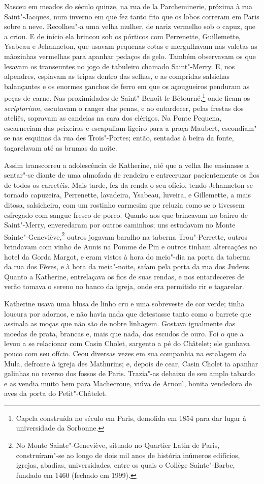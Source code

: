 Nasceu em meados do século quinze, na rua de la Parcheminerie, próxima à
rua Saint"-Jacques, num inverno em que fez tanto frio que os lobos correram
em Paris sobre a neve. Recolheu"-a uma velha mulher, de nariz vermelho sob
o capuz, que a criou. E de início ela brincou sob os pórticos com
Perrenette, Guillemette, Ysabeau e Jehanneton, que usavam pequenas cotas e
mergulhavam nas valetas as mãozinhas vermelhas para apanhar pedaços de
gelo. Também observavam os que lesavam os transeuntes no jogo de tabuleiro
chamado Saint"-Merry. E, nos alpendres, espiavam as tripas dentro das
selhas, e as compridas salsichas balançantes e os enormes ganchos de ferro
em que os açougueiros penduram as peças de carne. Nas proximidades de
Saint"-Benoît le Bétourné,\footnote{ Capela construída no século  em
Paris, demolida em 1854 para dar lugar à universidade da Sorbonne.} 
onde ficam os \textit{scriptorium}, escutavam o ranger das penas, e
ao entardecer, pelas frestas dos ateliês, sopravam as candeias na cara dos
clérigos. Na Ponte Pequena, escarneciam das peixeiras e escapuliam ligeiro
para a praça Maubert, escondiam"-se nas esquinas da rua des Trois"-Portes;
então, sentadas à beira da fonte, tagarelavam até as brumas da noite.

Assim transcorreu a adolescência de Katherine, até que a velha lhe
ensinasse a sentar"-se diante de uma almofada de rendeira e entrecruzar
pacientemente os fios de todos os carretéis. Mais tarde, fez da renda o
seu ofício, tendo Jehanneton se tornado capuzeira, Perrenette, lavadeira,
Ysabeau, luveira, e Gillemette, a mais ditosa, salsicheira, com um
rostinho carmesim que reluzia como se o tivessem esfregado com sangue
fresco de porco. Quanto aos que brincavam no bairro de Saint"-Merry,
enveredaram por outros caminhos; uns estudavam no Monte
Sainte"-Geneviève,\footnote{ No Monte Sainte"-Geneviève, situado no Quartier
Latin de Paris, construíram"-se ao longo de dois mil anos de história
inúmeros edifícios, igrejas, abadias, universidades, entre os quais o
Collège Sainte"-Barbe, fundado em 1460 (fechado em 1999).} outros
jogavam baralho na taberna Trou"-Perrette, outros brindavam com vinho de
Aunis na Pomme de Pin e outros tinham altercações no hotel da Gorda
Margot, e eram vistos à hora do meio"-dia na porta da taberna da rua dos
Fèves, e à hora da meia"-noite, saíam pela porta da rua dos Judeus. Quanto
a Katherine, entrelaçava os fios de suas rendas, e nos entardeceres de
verão tomava o sereno no banco da igreja, onde era permitido rir e
tagarelar.

Katherine usava uma blusa de linho cru e uma sobreveste de cor verde; tinha
loucura por adornos, e não havia nada que detestasse tanto como o barrete
que assinala as moças que não são de nobre linhagem. Gostava igualmente
das moedas de prata, brancas e, mais que nada, dos escudos de ouro. Foi o
que a levou a se relacionar com Casin Cholet, sargento a pé do Châtelet;
ele ganhava pouco com seu ofício. Ceou diversas vezes em sua companhia na
estalagem da Mula, defronte à igreja des Mathurins; e, depois de cear,
Casin Cholet ia apanhar galinhas no reverso dos fossos de Paris. Trazia"-as
debaixo de seu amplo tabardo e as vendia muito bem para Machecroue, viúva
de Arnoul, bonita vendedora de aves da porta do Petit"-Châtelet.

